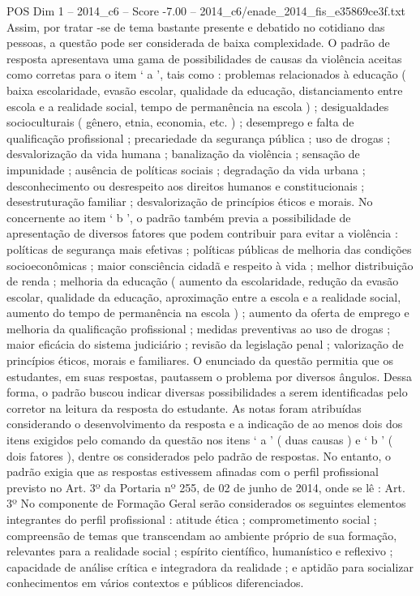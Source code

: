 \begin{textsample}{POS Dim 1 – 2014\_c6 – Score -7.00 – 2014\_c6/enade\_2014\_fis\_e35869ce3f.txt}
Assim, por tratar -se de tema bastante presente e debatido no cotidiano das pessoas, a questão pode ser considerada de baixa complexidade.
O padrão de resposta apresentava uma gama de possibilidades de causas da violência aceitas como corretas para o item ‘ a ’, tais como : problemas relacionados à educação ( baixa escolaridade, evasão escolar, qualidade da educação, distanciamento entre escola e a realidade social, tempo de permanência na escola ) ; desigualdades socioculturais ( gênero, etnia, economia, etc. ) ; desemprego e falta de qualificação profissional ; precariedade da segurança pública ; uso de drogas ; desvalorização da vida humana ; banalização da violência ; sensação de impunidade ; ausência de políticas sociais ; degradação da vida urbana ; desconhecimento ou desrespeito aos direitos humanos e constitucionais ; desestruturação familiar ; desvalorização de princípios éticos e morais.
No concernente ao item ‘ b ’, o padrão também previa a possibilidade de apresentação de diversos fatores que podem contribuir para evitar a violência : políticas de segurança mais efetivas ; políticas públicas de melhoria das condições socioeconômicas ; maior consciência cidadã e respeito à vida ; melhor distribuição de renda ; melhoria da educação ( aumento da escolaridade, redução da evasão escolar, qualidade da educação, aproximação entre a escola e a realidade social, aumento do tempo de permanência na escola ) ; aumento da oferta de emprego e melhoria da qualificação profissional ; medidas preventivas ao uso de drogas ; maior eficácia do sistema judiciário ; revisão da legislação penal ; valorização de princípios éticos, morais e familiares.
O enunciado da questão permitia que os estudantes, em suas respostas, pautassem o problema por diversos ângulos.
Dessa forma, o padrão buscou indicar diversas possibilidades a serem identificadas pelo corretor na leitura da resposta do estudante.
As notas foram atribuídas considerando o desenvolvimento da resposta e a indicação de ao menos dois dos itens exigidos pelo comando da questão nos itens ‘ a ’ ( duas causas ) e ‘ b ’ ( dois fatores ), dentre os considerados pelo padrão de respostas.
No entanto, o padrão exigia que as respostas estivessem afinadas com o perfil profissional previsto no Art. 3º da Portaria nº 255, de 02 de junho de 2014, onde se lê : Art. 3º No componente de Formação Geral serão considerados os seguintes elementos integrantes do perfil profissional : atitude ética ; comprometimento social ; compreensão de temas que transcendam ao ambiente próprio de sua formação, relevantes para a realidade social ; espírito científico, humanístico e reflexivo ; capacidade de análise crítica e integradora da realidade ; e aptidão para socializar conhecimentos em vários contextos e públicos diferenciados.

\end{textsample}
